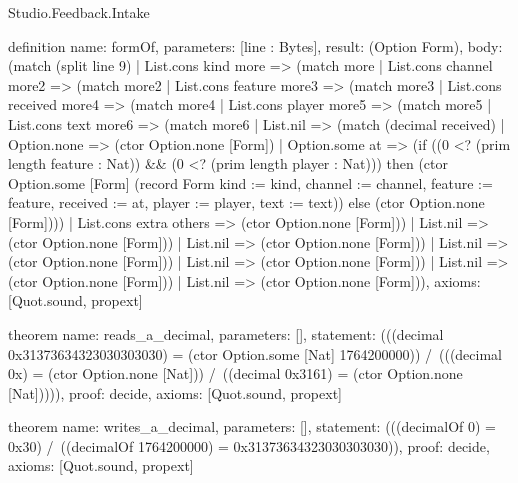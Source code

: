 \begin{lexlean}{Studio.Feedback.Intake}
\begin{semanticmodule}
definition{
  name: formOf,
  parameters: [line : Bytes],
  result: (Option Form),
  body: (match (split line 9)
    | List.cons kind more => (match more
      | List.cons channel more2 => (match more2
        | List.cons feature more3 => (match more3
          | List.cons received more4 => (match more4
            | List.cons player more5 => (match more5
              | List.cons text more6 => (match more6
                | List.nil => (match (decimal received)
                  | Option.none => (ctor Option.none [Form])
                  | Option.some at => (if ((0 <? (prim length feature : Nat)) && (0 <? (prim length player : Nat))) then (ctor Option.some [Form] (record Form {kind := kind, channel := channel, feature := feature, received := at, player := player, text := text})) else (ctor Option.none [Form])))
                | List.cons extra others => (ctor Option.none [Form]))
              | List.nil => (ctor Option.none [Form]))
            | List.nil => (ctor Option.none [Form]))
          | List.nil => (ctor Option.none [Form]))
        | List.nil => (ctor Option.none [Form]))
      | List.nil => (ctor Option.none [Form]))
    | List.nil => (ctor Option.none [Form])),
  axioms: [Quot.sound, propext]
}

theorem{
  name: reads_a_decimal,
  parameters: [],
  statement: (((decimal 0x31373634323030303030) = (ctor Option.some [Nat] 1764200000)) /\ (((decimal 0x) = (ctor Option.none [Nat])) /\ ((decimal 0x3161) = (ctor Option.none [Nat])))),
  proof: decide{},
  axioms: [Quot.sound, propext]
}

theorem{
  name: writes_a_decimal,
  parameters: [],
  statement: (((decimalOf 0) = 0x30) /\ ((decimalOf 1764200000) = 0x31373634323030303030)),
  proof: decide{},
  axioms: [Quot.sound, propext]
}
\end{semanticmodule}
\end{lexlean}
